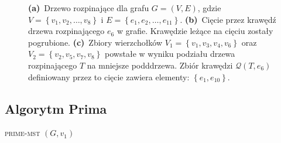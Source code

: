 \begin{figure}[!htbp]
\begin{subfigure}[b]{0.24\textwidth}
		\caption{}
		\label{fig:kruskal:h}
	\end{subfigure}
	\hfill\null
	\caption{
		\textbf{(a)}~Drzewo rozpinające dla grafu $G = \left( V, E \right)$, gdzie $V = \left\{ v_{1}, v_{2}, \dots, v_{8} \right\}$ i $E = \left\{ e_{1}, e_{2}, \dots, e_{11} \right\}$.
		\textbf{(b)}~Cięcie przez krawędź drzewa rozpinającego $e_{6}$ w grafie. Krawędzie leżące na cięciu zostały pogrubione.
		\textbf{(c)}~Zbiory wierzchołków $V_{1} = \left\{ v_{1}, v_{3}, v_{4}, v_{6} \right\}$ oraz $V_{2} = \left\{ v_{2}, v_{5}, v_{7}, v_{8} \right\}$ powstałe w wyniku podziału drzewa rozpinającego $T$ na mniejsze podddrzewa. Zbiór krawędzi $\mathcal{Q} \left( T, e_{6} \right)$ definiowany przez to cięcie zawiera elementy: $\left\{ e_{1}, e_{10} \right\}$.
	}
	\label{fig:cut}
\end{figure}

\subsection{Algorytm Prima}

\begin{pseudokod}[!htbp]
	\DontPrintSemicolon
	\caption{\textsc{prime-mst} $\left( G, v_{1} \right)$}
	\label{alg:prime}
\end{pseudokod}

